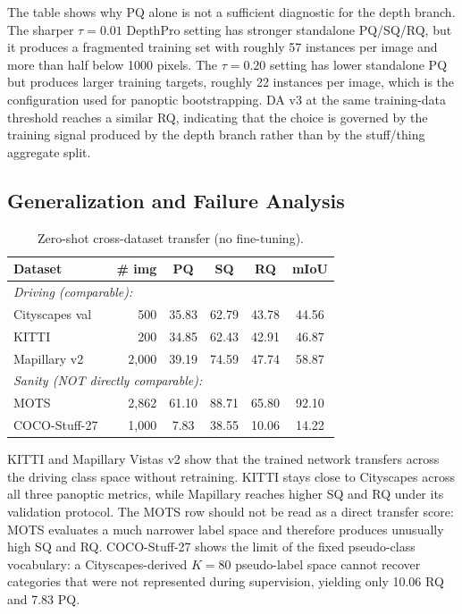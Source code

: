 \documentclass[10pt,twocolumn,letterpaper]{article}
\begin{document}
The table shows why PQ alone is not a sufficient diagnostic for the depth branch. The sharper $\tau = 0.01$ DepthPro setting has stronger standalone PQ/SQ/RQ, but it produces a fragmented training set with roughly 57 instances per image and more than half below 1000 pixels. The $\tau = 0.20$ setting has lower standalone PQ but produces larger training targets, roughly 22 instances per image, which is the configuration used for panoptic bootstrapping. DA v3 at the same training-data threshold reaches a similar RQ, indicating that the choice is governed by the training signal produced by the depth branch rather than by the stuff/thing aggregate split.


\subsection{Generalization and Failure Analysis}
\label{sec:exp:generalization}

\begin{table}[t]
\centering
\small
\setlength{\tabcolsep}{3pt}
\begin{tabular}{l r c c c c}
\toprule
Dataset & \# img & PQ & SQ & RQ & mIoU \\
\midrule
\multicolumn{6}{l}{\emph{Driving (comparable):}} \\
Cityscapes val & 500 & 35.83 & 62.79 & 43.78 & 44.56 \\
KITTI~\cite{geiger2012kitti} & 200 & 34.85 & 62.43 & 42.91 & 46.87 \\
Mapillary v2 & 2{,}000 & 39.19 & 74.59 & 47.74 & 58.87 \\
\midrule
\multicolumn{6}{l}{\emph{Sanity (NOT directly comparable):}} \\
MOTS~\cite{voigtlaender2019mots} & 2{,}862 & 61.10 & 88.71 & 65.80 & 92.10 \\
COCO-Stuff-27~\cite{caesar2018coco} & 1{,}000 & 7.83 & 38.55 & 10.06 & 14.22 \\
\bottomrule
\end{tabular}
\caption{Zero-shot cross-dataset transfer (no fine-tuning).}
\label{tab:transfer}
\end{table}

KITTI and Mapillary Vistas v2 show that the trained network transfers across the driving class space without retraining. KITTI stays close to Cityscapes across all three panoptic metrics, while Mapillary reaches higher SQ and RQ under its validation protocol. The MOTS row should not be read as a direct transfer score: MOTS evaluates a much narrower label space and therefore produces unusually high SQ and RQ. COCO-Stuff-27 shows the limit of the fixed pseudo-class vocabulary: a Cityscapes-derived $K = 80$ pseudo-label space cannot recover categories that were not represented during supervision, yielding only 10.06 RQ and 7.83 PQ.
\end{document}
